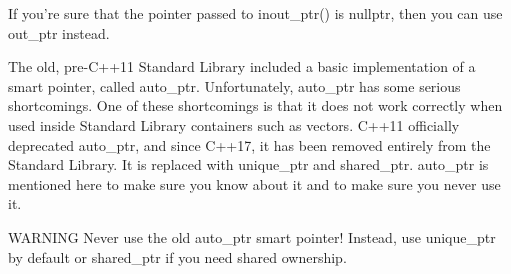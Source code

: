 If you’re sure that the pointer passed to inout\_ptr() is nullptr, then you can use out\_ptr instead.



The old, pre-C++11 Standard Library included a basic implementation of a smart pointer, called auto\_ptr. Unfortunately, auto\_ptr has some serious shortcomings. One of these shortcomings is that it does not work correctly when used inside Standard Library containers such as vectors. C++11 officially deprecated auto\_ptr, and since C++17, it has been removed entirely from the Standard Library. It is replaced with unique\_ptr and shared\_ptr. auto\_ptr is mentioned here to make sure you know about it and to make sure you never use it.

\begin{myWarning}{WARNING}
Never use the old auto\_ptr smart pointer! Instead, use unique\_ptr by default or shared\_ptr if you need shared ownership.
\end{myWarning}
